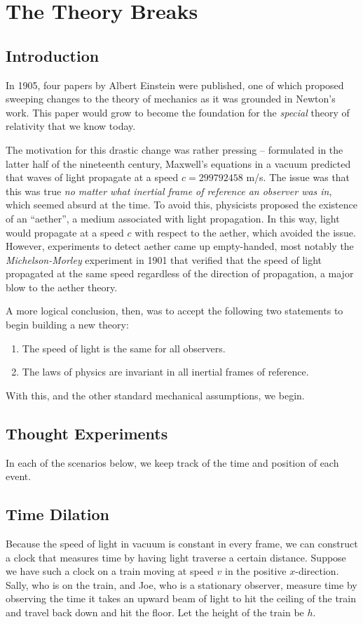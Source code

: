 \section{The Theory Breaks}
\subsection{Introduction}
In 1905, four papers by Albert Einstein were published, one of which proposed sweeping changes to the theory of mechanics as it was grounded in Newton's work. This paper would grow to become the foundation for the \textit{special} theory of relativity that we know today. 

The motivation for this drastic change was rather pressing -- formulated in the latter half of the nineteenth century, Maxwell's equations in a vacuum predicted that waves of light propagate at a speed $c = 299792458$ m/s. The issue was that this was true \textit{no matter what inertial frame of reference an observer was in}, which seemed absurd at the time. To avoid this, physicists proposed the existence of an ``aether'', a medium associated with light propagation. In this way, light would propagate at a speed $c$ with respect to the aether, which avoided the issue. However, experiments to detect aether came up empty-handed, most notably the \textit{Michelson-Morley} experiment in 1901 that verified that the speed of light propagated at the same speed regardless of the direction of propagation, a major blow to the aether theory.

A more logical conclusion, then, was to accept the following two statements to begin building a new theory:
\begin{enumerate}
    \item The speed of light is the same for all observers.
    \item The laws of physics are invariant in all inertial frames of reference. 
\end{enumerate}

With this, and the other standard mechanical assumptions, we begin. 

\subsection{Thought Experiments}
In each of the scenarios below, we keep track of the time and position of each event. 

\subsection*{Time Dilation}
Because the speed of light in vacuum is constant in every frame, we can construct a clock that measures time by having light traverse a certain distance. Suppose we have such a clock on a train moving at speed $v$ in the positive $x$-direction. Sally, who is on the train, and Joe, who is a stationary observer, measure time by observing the time it takes an upward beam of light to hit the ceiling of the train and travel back down and hit the floor. Let the height of the train be $h$.

